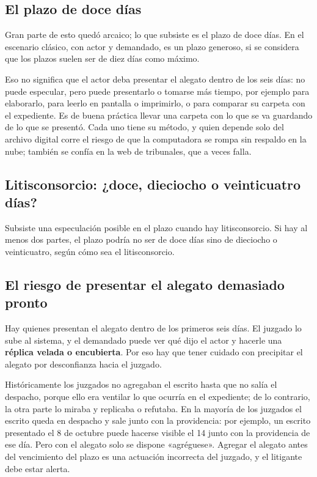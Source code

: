 \documentclass[12pt,oneside]{book}
\begin{document}
\subsection{El plazo de doce días}

Gran parte de esto quedó arcaico; lo que subsiste es el plazo de doce días. En el escenario clásico, con actor y demandado, es un plazo generoso, si se considera que los plazos suelen ser de diez días como máximo.

Eso no significa que el actor deba presentar el alegato dentro de los seis días: no puede especular, pero puede presentarlo o tomarse más tiempo, por ejemplo para elaborarlo, para leerlo en pantalla o imprimirlo, o para comparar su carpeta con el expediente. Es de buena práctica llevar una carpeta con lo que se va guardando de lo que se presentó. Cada uno tiene su método, y quien depende solo del archivo digital corre el riesgo de que la computadora se rompa sin respaldo en la nube; también se confía en la web de tribunales, que a veces falla.

\subsection{Litisconsorcio: ¿doce, dieciocho o veinticuatro días?}

Subsiste una especulación posible en el plazo cuando hay litisconsorcio. Si hay al menos dos partes, el plazo podría no ser de doce días sino de dieciocho o veinticuatro, según cómo sea el litisconsorcio.


\subsection{El riesgo de presentar el alegato demasiado pronto}

Hay quienes presentan el alegato dentro de los primeros seis días. El juzgado lo sube al sistema, y el demandado puede ver qué dijo el actor y hacerle una \textbf{réplica velada o encubierta}. Por eso hay que tener cuidado con precipitar el alegato por desconfianza hacia el juzgado.

Históricamente los juzgados no agregaban el escrito hasta que no salía el despacho, porque ello era ventilar lo que ocurría en el expediente; de lo contrario, la otra parte lo miraba y replicaba o refutaba. En la mayoría de los juzgados el escrito queda en despacho y sale junto con la providencia: por ejemplo, un escrito presentado el 8 de octubre puede hacerse visible el 14 junto con la providencia de ese día. Pero con el alegato solo se dispone «agréguese». Agregar el alegato antes del vencimiento del plazo es una actuación incorrecta del juzgado, y el litigante debe estar alerta.
\end{document}
